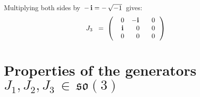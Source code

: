 Multiplying both sides by \,$-\,\textnormal{\bf i} = -\,\sqrt{-1}$\, gives:
\begin{equation*}
J_{3}
\;\; = \;
	\left(\!
		\begin{array}{ccc}
			{\color{white}-}0 & {\color{black}-}\i & {\color{white}-}0 \\
			{\color{white}-}\i & {\color{white}-}0 & {\color{white}-}0 \\
			{\color{white}-}0 & {\color{white}-}0 & {\color{white}-}0 \\
			\end{array}
		\,\right)
\end{equation*}


\section{Properties of the generators \,$J_{1}, J_{2}, J_{3} \,\in\, \mathfrak{so}(3)$}


